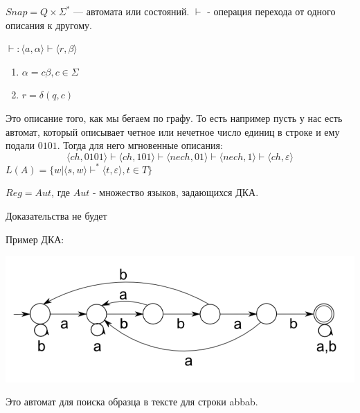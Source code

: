 $Snap = Q \times \Sigma^*$ ---  автомата или состояний.  $\vdash$ - операция перехода от одного описания к другому.

$\vdash: \langle a, \alpha \rangle \vdash \langle r,\beta\rangle$
\begin{enumerate}
    \item $\alpha = c\beta , c \in \Sigma$
    \item $r = \delta( q,c)$
\end{enumerate}

Это описание того, как мы бегаем по графу. То есть например пусть у нас есть автомат, который описывает четное или нечетное число единиц в строке и ему подали $0101$. Тогда для него мгновенные описания:
$$\langle ch, 0101\rangle \vdash \langle ch, 101\rangle \vdash \langle nech, 01\rangle \vdash \langle nech , 1\rangle \vdash \langle ch, \varepsilon\rangle$$
 $L(A) = \{w | \langle s,w\rangle \vdash^* \langle t, \varepsilon\rangle, t \in T\}$


$Reg = Aut$, где $Aut$ - множество языков, задающихся ДКА.

Доказательства не будет

Пример ДКА:

\begin{center}
    \includegraphics[width = 14cm]{assets/7_4_1.png}
\end{center}

Это автомат для поиска образца в тексте для строки abbab.